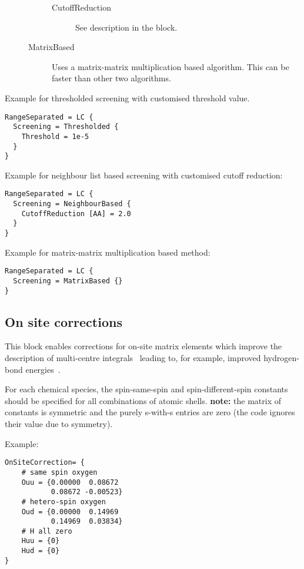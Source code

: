 \begin{description}
\begin{description}
    \begin{description}
    \item[CutoffReduction] See description in the
       block.
    \end{description}


  \item[MatrixBased] Uses a matrix-matrix multiplication based algorithm. This
    can be faster than other two algorithms.
  \end{description}
\end{description}

Example for thresholded screening with customised threshold value.
\begin{verbatim}
RangeSeparated = LC {
  Screening = Thresholded {
    Threshold = 1e-5
  }
}
\end{verbatim}

Example for neighbour list based screening with customised cutoff reduction:
\begin{verbatim}
RangeSeparated = LC {
  Screening = NeighbourBased {
    CutoffReduction [AA] = 2.0
  }
}
\end{verbatim}

Example for matrix-matrix multiplication based method:
\begin{verbatim}
RangeSeparated = LC {
  Screening = MatrixBased {}
}
\end{verbatim}


\subsection{On site corrections}
\label{sec:dftbp.Onsites}

This block enables corrections for on-site matrix elements which improve the
description of multi-centre integrals~\cite{garcia14Thesis} leading to, for
example, improved hydrogen-bond energies~\cite{dominguez15}. 

For each chemical species, the spin-same-spin and spin-different-spin constants
should be specified for all combinations of atomic shells. {\bf note:} the
matrix of constants is symmetric and the purely s-with-s entries are zero (the
code ignores their value due to symmetry).

Example:
\begin{verbatim}
OnSiteCorrection= {
    # same spin oxygen
    Ouu = {0.00000  0.08672
           0.08672 -0.00523}
    # hetero-spin oxygen
    Oud = {0.00000  0.14969
           0.14969  0.03834}
    # H all zero
    Huu = {0}
    Hud = {0}
}
\end{verbatim}

